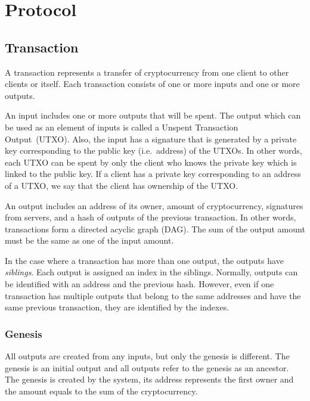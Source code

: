\documentclass[a4paper, oneside]{discothesis}
\begin{document}
\section{Protocol}

\subsection{Transaction}
A transaction represents a transfer of cryptocurrency from one client to other clients or itself.
Each transaction consists of one or more inputs and one or more outputs.

An input includes one or more outputs that will be spent.
The output which can be used as an element of inputs is called
a Unspent Transaction Output~(UTXO).
Also, the input has a signature that is generated by a private key
corresponding to the public key (i.e.\ address) of the UTXOs.
In other words, each UTXO can be spent by only the client who knows the private
key which is linked to the public key.
If a client has a private key corresponding to an address of a UTXO,
we say that the client has ownership of the UTXO.

An output includes an address of its owner, amount of cryptocurrency, signatures from servers,
and a hash of outputs of the previous transaction.
In other words, transactions form a directed acyclic graph (DAG).
The sum of the output amount must be the same as one of the input amount.

In the case where a transaction has more than one output, the outputs have \emph{siblings}.
Each output is assigned an index in the siblings.
Normally, outputs can be identified with an address and the previous hash.
However, even if one transaction has multiple outputs that belong to the same addresses
and have the same previous transaction, they are identified by the indexes.


\subsubsection{Genesis}
All outputs are created from any inputs, but only the genesis is different.
The genesis is an initial output and all outputs refer to the genesis as an ancestor.
The genesis is created by the system, its address represents the first owner
and the amount equals to the sum of the cryptocurrency.
\end{document}
